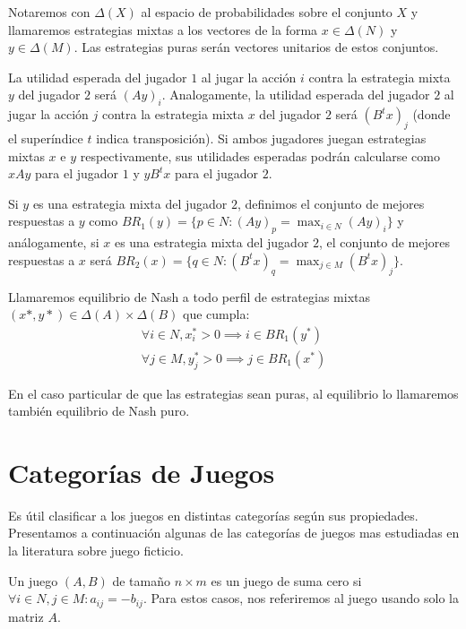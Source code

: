Notaremos con $\Delta(X)$ al espacio de probabilidades sobre el conjunto $X$ y llamaremos estrategias mixtas a los vectores de la forma $x \in \Delta(N)$ y $y \in \Delta(M)$. Las estrategias puras serán vectores unitarios de estos conjuntos.

La utilidad esperada del jugador $1$ al jugar la acción $i$ contra la estrategia mixta $y$ del jugador $2$ será $(Ay)_i$. Analogamente, la utilidad esperada del jugador $2$ al jugar la acción $j$ contra la estrategia mixta $x$ del jugador $2$ será $(B^tx)_j$ (donde el superíndice $t$ indica transposición). Si ambos jugadores juegan estrategias mixtas $x$ e $y$ respectivamente, sus utilidades esperadas podrán calcularse como $xAy$ para el jugador $1$ y $yB^tx$ para el jugador $2$.

Si $y$ es una estrategia mixta del jugador $2$, definimos el conjunto de mejores respuestas a $y$ como $BR_1(y) = \{p \in N : (Ay)_p = \max_{i \in N} (Ay)_i\}$ y análogamente, si $x$ es una estrategia mixta del jugador $2$, el conjunto de mejores respuestas a $x$ será $BR_2(x) = \{q \in N : (B^tx)_q = \max_{j \in M} (B^tx)_j\}$.

Llamaremos equilibrio de Nash a todo perfil de estrategias mixtas $(x*, y*) \in \Delta(A) \times \Delta(B)$ que cumpla:
\begin{gather}
    \forall i \in N, x^*_i > 0 \implies i \in BR_1(y^*) \\
    \forall j \in M, y^*_j > 0 \implies j \in BR_1(x^*)
\end{gather}

En el caso particular de que las estrategias sean puras, al equilibrio lo llamaremos también equilibrio de Nash puro.

\section{Categorías de Juegos}

Es útil clasificar a los juegos en distintas categorías según sus propiedades. Presentamos a continuación algunas de las categorías de juegos mas estudiadas en la literatura sobre juego ficticio.

\begin{definition}
    Un juego $(A, B)$ de tamaño $n \times m$ es un juego de suma cero si $\forall i \in N, j \in M : a_{ij} = -b_{ij}$. Para estos casos, nos referiremos al juego usando solo la matriz $A$.
\end{definition}

